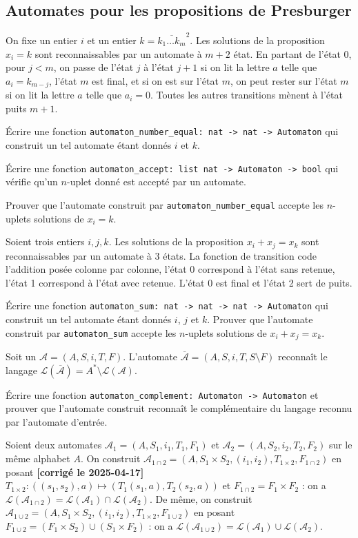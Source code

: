 \documentclass{article}
\begin{document}
\subsection{Automates pour les propositions de Presburger}

On fixe un entier \(i\) et un entier \(k = \overline{k_1 \dots k_m}^2\). Les solutions de la proposition \(x_i = k\) sont reconnaissables par un automate à \(m + 2\) état. En partant de l'état 0, pour \(j < m\), on passe de l'état \(j\) à l'état \(j + 1\) si on lit la lettre \(a\) telle que \(a_i = k_{m - j}\), l'état \(m\) est final, et si on est sur l'état \(m\), on peut rester sur l'état \(m\) si on lit la lettre \(a\) telle que \(a_i = 0\). Toutes les autres transitions mènent à l'état puits \(m + 1\).

Écrire une fonction \texttt{automaton_number_equal: nat -> nat -> Automaton} qui construit un tel automate étant donnés \(i\) et \(k\).

Écrire une fonction \texttt{automaton_accept: list nat -> Automaton -> bool} qui vérifie qu'un \(n\)-uplet donné est accepté par un automate.

Prouver que l'automate construit par \texttt{automaton_number_equal} accepte les \(n\)-uplets solutions de \(x_i = k\).

Soient trois entiers \(i, j, k\). Les solutions de la proposition \(x_i + x_j = x_k\) sont reconnaissables par un automate à 3 états. La fonction de transition code l'addition posée colonne par colonne, l'état 0 correspond à l'état sans retenue, l'état 1 correspond à l'état avec retenue. L'état 0 est final et l'état 2 sert de puits.

Écrire une fonction \texttt{automaton_sum: nat -> nat -> nat -> Automaton} qui construit un tel automate étant donnés \(i\), \(j\) et \(k\). Prouver que l'automate construit par \texttt{automaton_sum} accepte les \(n\)-uplets solutions de \(x_i + x_j = x_k\).

Soit un \(\mathcal A = (A, S, i, T, F)\). L'automate \(\overline{\mathcal A} = (A, S, i, T, S \setminus F)\) reconnaît le langage \(\mathcal L(\overline{\mathcal A}) = A^* \setminus \mathcal L(\mathcal A)\).

Écrire une fonction \texttt{automaton_complement: Automaton -> Automaton} et prouver que l'automate construit reconnaît le complémentaire du langage reconnu par l'automate d'entrée.

Soient deux automates \(\mathcal A_1 = (A, S_1, i_1, T_1, F_1)\) et \(\mathcal A_2 = (A, S_2, i_2, T_2, F_2)\) sur le même alphabet \(A\).
On construit \(\mathcal A_{1 \cap 2} = (A, S_1 \times S_2, (i_1, i_2), T_{1 \times 2}, F_{1 \cap 2})\) en posant \textbf{[corrigé le 2025-04-17]} \(T_{1 \times 2} : ((s_1, s_2), a) \mapsto (T_1(s_1, a), T_2(s_2, a))\) et \(F_{1 \cap 2} = F_1 \times F_2\) : on a \(\mathcal L(\mathcal A_{1 \cap 2}) = \mathcal L(\mathcal A_1) \cap \mathcal L(\mathcal A_2)\).
De même, on construit \(\mathcal A_{1 \cup 2} = (A, S_1 \times S_2, (i_1, i_2), T_{1 \times 2}, F_{1 \cup 2})\)
en posant \(F_{1 \cup 2} = (F_1 \times S_2) \cup (S_1 \times F_2)\) :
on a \(\mathcal L(\mathcal A_{1 \cup 2}) = \mathcal L(\mathcal A_1) \cup \mathcal L(\mathcal A_2)\).
\end{document}
